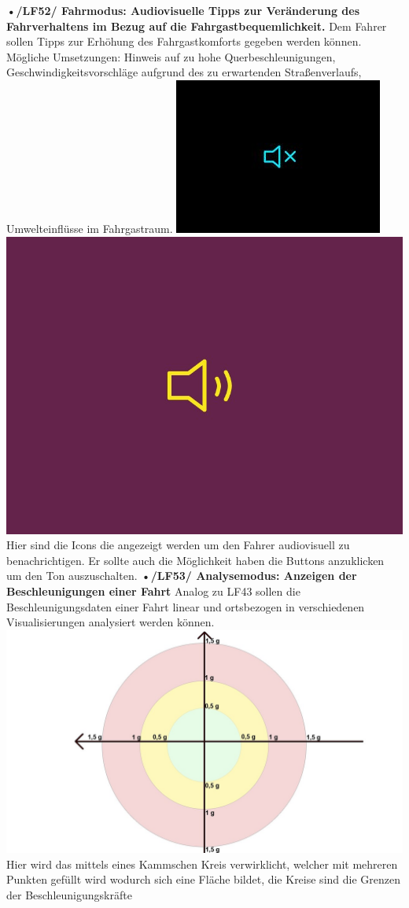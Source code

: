 \textbf{•/LF52/ Fahrmodus: Audiovisuelle Tipps zur Veränderung des Fahrverhaltens im Bezug auf die Fahrgastbequemlichkeit.}
Dem Fahrer sollen Tipps zur Erhöhung des Fahrgastkomforts gegeben werden können. Mögliche Umsetzungen: Hinweis auf zu hohe Querbeschleunigungen, Geschwindigkeitsvorschläge aufgrund des zu erwartenden Straßenverlaufs, Umwelteinflüsse im Fahrgastraum.
 \includegraphics[scale=0.5]{images/LF34_leiser.jpg}
  \includegraphics[scale=0.5]{images/LF34_lauter.jpg}
Hier sind die Icons die angezeigt werden um den Fahrer audiovisuell zu benachrichtigen.                                                                    Er sollte auch die Möglichkeit haben die Buttons anzuklicken um den Ton auszuschalten. 
\textbf{•/LF53/ Analysemodus: Anzeigen der Beschleunigungen einer Fahrt }
Analog zu LF43 sollen die Beschleunigungsdaten einer Fahrt linear und ortsbezogen in verschiedenen Visualisierungen analysiert werden können.
 \includegraphics[scale=0.5]{images/LF53_Kalm.jpg}
Hier wird das mittels eines Kammschen Kreis verwirklicht, welcher mit mehreren Punkten gefüllt wird wodurch sich eine Fläche bildet, die Kreise sind die Grenzen der Beschleunigungskräfte

